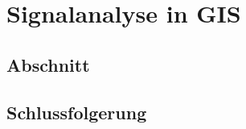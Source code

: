 %
%
%
\chapter{Signalanalyse in GIS\label{chapter:gis}}
\begin{refsection}

\section{Abschnitt}

\section{Schlussfolgerung}

\printbibliography[heading=subbibliography]
\end{refsection}
